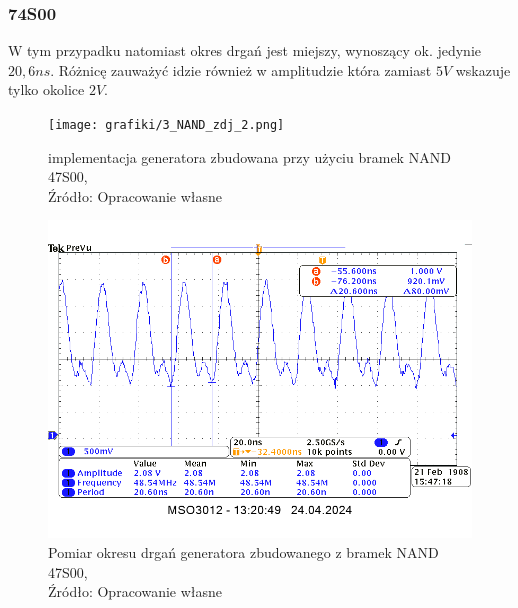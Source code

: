 \documentclass{article}
\begin{document}
    \subsubsection{74S00}
      W tym przypadku natomiast okres drgań jest miejszy, wynoszący ok. jedynie $20,6ns$. Różnicę zauważyć idzie również w amplitudzie która zamiast $5V$ wskazuje tylko okolice $2V$.
      \begin{figure}[!ht]
        \begin{minipage}{.5\textwidth}
          \centering
          \texttt{[image: grafiki/3\_NAND\_zdj\_2.png]}
          \caption{implementacja generatora zbudowana przy użyciu bramek NAND 47S00,
          \\Źródło: Opracowanie własne}
        \end{minipage}
        \begin{minipage}{.5\textwidth}
          \centering
          \includegraphics[scale=0.35]{grafiki/74S00_pomiar.png}
          \caption{Pomiar okresu drgań generatora zbudowanego z bramek NAND 47S00,
          \\Źródło: Opracowanie własne}
        \end{minipage}
      \end{figure}
\end{document}
